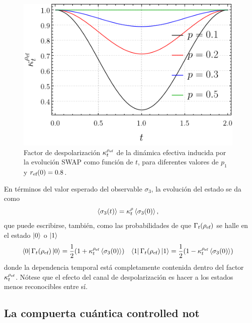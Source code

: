 \begin{figure}[ht!]
  \centering
  \includegraphics[width=0.6\linewidth]{chapter3/figures_toy/K(t).png}
  \caption{Factor de despolarización $\kappa_{t}^{\rho_{\text{ef}}}$ de la dinámica efectiva inducida por la evolución SWAP como función de $t$, para diferentes valores de $p_{1}$ y $r_{\text{ef}}(0)=0.8$.}
  \label{fig:SWAPFactor2Dt}
\end{figure}

En términos del valor esperado del observable $\sigma_{3}$, la evolución del estado se da como
\begin{equation}
  \expval{\sigma_{3}(t)}=\kappa_{t}^{\rho}\expval{\sigma_{3}(0)},\nonumber
\end{equation}
que puede escribirse, también, como las probabilidades de que $\Gamma_{t}(\rho_{\text{ef}})$ se halle en el estado $\ket{0}$ o $\ket{1}$
 \begin{align}
  \bra{0}\Gamma_{t}(\rho_{\text{ef}})\ket{0}=\frac{1}{2}(1+\kappa_{t}^{\rho_{\text{ef}}}\expval{\sigma_{3}(0)}) && \bra{1}\Gamma_{t}(\rho_{\text{ef}})\ket{1}=\frac{1}{2}(1-\kappa_{t}^{\rho_{\text{ef}}}\expval{\sigma_{3}(0)})\nonumber
 \end{align}
 donde la dependencia temporal está completamente contenida dentro del factor $\kappa_{t}^{\rho_{\text{ef}}}$. Nótese que el efecto del canal de despolarización es hacer a los estados menos reconocibles entre sí.


\subsection{La compuerta cuántica controlled not}

